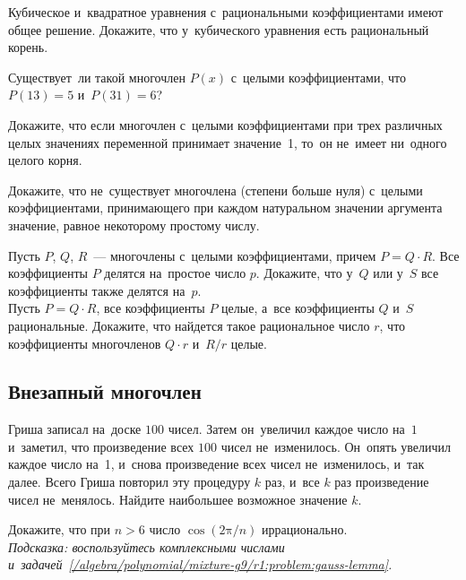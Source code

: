 \begin{problems}

\item
Кубическое и~квадратное уравнения с~рациональными коэффициентами имеют общее
решение.
Докажите, что у~кубического уравнения есть рациональный корень.

\item
Существует~ли такой многочлен $P(x)$ с~целыми коэффициентами, что
$P(13) = 5$ и~$P(31) = 6$?

\item
Докажите, что если многочлен с~целыми коэффициентами при трех различных целых
значениях переменной принимает значение~1, то~он не~имеет ни~одного целого
корня.

\item
Докажите, что не~существует многочлена (степени больше нуля) с~целыми
коэффициентами, принимающего при каждом натуральном значении аргумента
значение, равное некоторому простому числу.

\item
\label{/algebra/polynomial/mixture-g9/r1:problem:gauss-lemma}%
\subproblem
Пусть $P$, $Q$, $R$~— многочлены с~целыми коэффициентами, причем
$P = Q \cdot R$.
Все коэффициенты $P$ делятся на~простое число $p$.
Докажите, что у~$Q$ или у~$S$ все коэффициенты также делятся на~$p$.
\\
\subproblem
Пусть $P = Q \cdot R$, все коэффициенты $P$ целые, а~все коэффициенты $Q$ и~$S$
рациональные.
Докажите, что найдется такое рациональное число $r$, что коэффициенты
многочленов $Q \cdot r$ и~$R / r$ целые.

\end{problems}

\subsection*{Внезапный многочлен}

\begin{problems}

\item
Гриша записал на~доске $100$ чисел.
Затем он~увеличил каждое число на~$1$ и~заметил, что произведение всех
$100$ чисел не~изменилось.
Он~опять увеличил каждое число на~1, и~снова произведение всех чисел
не~изменилось, и~так далее.
Всего Гриша повторил эту процедуру $k$ раз, и~все $k$ раз произведение чисел
не~менялось.
Найдите наибольшее возможное значение $k$.

\item
Докажите, что при $n > 6$ число $\cos(2 \mathrm{\pi} / n)$ иррационально.
\\\emph{Подсказка: воспользуйтесь комплексными числами
и~задачей~\ref{/algebra/polynomial/mixture-g9/r1:problem:gauss-lemma}.}

\end{problems}

